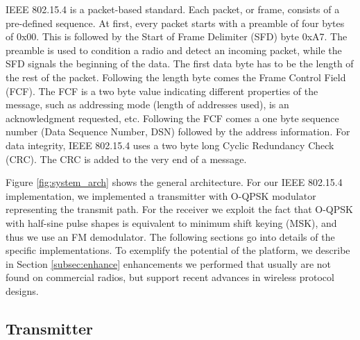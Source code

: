 IEEE 802.15.4 is a packet-based standard. Each packet, or frame, consists of a
pre-defined sequence. At first, every packet starts with a preamble of four
bytes of 0x00. This is followed by the Start of Frame Delimiter (SFD) byte
0xA7. The preamble is used to condition a radio and detect an incoming packet,
while the SFD signals the beginning of the data. The first data byte has to be
the length of the rest of the packet. Following the length byte comes the
Frame Control Field (FCF). The FCF is a two byte value indicating different
properties of the message, such as addressing mode (length of addresses used),
is an acknowledgment requested, etc. Following the FCF comes a one byte
sequence number (Data Sequence Number, DSN) followed by the address
information. For data integrity, IEEE 802.15.4 uses a two byte long Cyclic Redundancy Check
(CRC). The CRC is added to the very end of a message.

Figure \ref{fig:system_arch} shows the general \sdr architecture. For our IEEE
802.15.4 implementation, we implemented a transmitter with O-QPSK modulator
representing the transmit path. For the receiver we exploit the fact that
O-QPSK with half-sine pulse shapes is equivalent to minimum shift keying
(MSK), and thus we use an FM demodulator. The following sections go into
details of the specific implementations. To exemplify the potential of the
\sdr platform, we describe in Section \ref{subsec:enhance} enhancements we
performed that usually are not found on commercial radios, but support recent
advances in wireless protocol designs.


\subsection{Transmitter}

